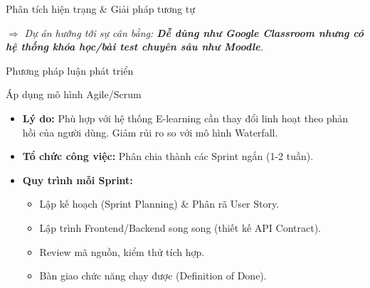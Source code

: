 \documentclass[10pt]{beamer}
\begin{document}
\begin{frame}{Phân tích hiện trạng \& Giải pháp tương tự}
    \begin{table}[]
        \centering
    \end{table}
    \vspace{0.3cm}
    $\Rightarrow$ \textit{Dự án hướng tới sự cân bằng: \textbf{Dễ dùng như Google Classroom nhưng có hệ thống khóa học/bài test chuyên sâu như Moodle}.}
\end{frame}

\begin{frame}{Phương pháp luận phát triển}
    \begin{block}{Áp dụng mô hình Agile/Scrum}
        \begin{itemize}
            \item \textbf{Lý do:} Phù hợp với hệ thống E-learning cần thay đổi linh hoạt theo phản hồi của người dùng. Giảm rủi ro so với mô hình Waterfall.
            \item \textbf{Tổ chức công việc:} Phân chia thành các Sprint ngắn (1-2 tuần).
            \item \textbf{Quy trình mỗi Sprint:}
            \begin{itemize}
                \item Lập kế hoạch (Sprint Planning) \& Phân rã User Story.
                \item Lập trình Frontend/Backend song song (thiết kế API Contract).
                \item Review mã nguồn, kiểm thử tích hợp.
                \item Bàn giao chức năng chạy được (Definition of Done).
            \end{itemize}
        \end{itemize}
    \end{block}
\end{frame}
\end{document}
